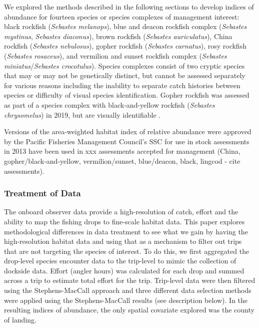 \documentclass[preprint, 3p,
authoryear]{elsarticle} %
\begin{document}
We explored the methods described in the following sections to develop
indices of abundance for fourteen species or species complexes of
management interest: black rockfish (\emph{Sebastes melanops}), blue and
deacon rockfish complex (\emph{Sebastes mystinus}, \emph{Sebastes
diaconus}), brown rockfish (\emph{Sebastes auriculatus}), China rockfish
(\emph{Sebastes nebulosus}), gopher rockfish (\emph{Sebastes carnatus}),
rosy rockfish (\emph{Sebastes rosaceus}), and vermilion and sunset
rockfish complex (\emph{Sebastes miniatus}/\emph{Sebastes crocotulus}).
Species complexes consist of two cryptic species that may or may not be
genetically distinct, but cannot be assessed separately for various
reasons including the inability to separate catch histories between
species or difficulty of visual species identification. Gopher rockfish
was assessed as part of a species complex with black-and-yellow rockfish
(\emph{Sebastes chrysomelus}) in 2019, but are visually identifiable
\citep{Monk2019}.

Versions of the area-weighted habitat index of relative abundance were
approved by the Pacific Fisheries Management Council's SSC for use in
stock assessments in 2013 have been used in xxx assessments accepted for
management (China, gopher/black-and-yellow, vermilion/sunset,
blue/deacon, black, lingcod - cite assessments).

\hypertarget{treatment-of-data}{%
\subsubsection{Treatment of Data}\label{treatment-of-data}}

The onboard observer data provide a high-resolution of catch, effort and
the ability to map the fishing drops to fine-scale habitat data. This
paper explores methodological differences in data treatment to see what
we gain by having the high-resolution habitat data and using that as a
mechanism to filter out trips that are not targeting the species of
interest. To do this, we first aggregated the drop-level species
encounter data to the trip-level to mimic the collection of dockside
data. Effort (angler hours) was calculated for each drop and summed
across a trip to estimate total effort for the trip. Trip-level data
were then filtered using the Stephens-MacCall approach and three
different data selection methods were applied using the Stephens-MacCall
results (see description below). In the resulting indices of abundance,
the only spatial covariate explored was the county of landing.
\end{document}
